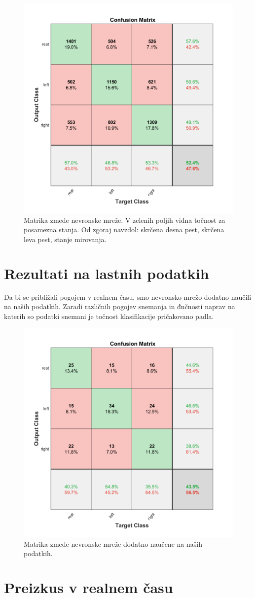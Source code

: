 \begin{figure}
\begin{center}
\includegraphics[width=0.8\linewidth]{slike/Confusion_13-20Hz_0s-4s.png}
\end{center}
\caption{Matrika zmede nevronske mreže. V zelenih poljih vidna točnost za posamezna stanja. Od zgoraj navzdol: skrčena desna pest, skrčena leva pest, stanje mirovanja.}
\label{slika:nevronska_mreza_matrika}
\end{figure}



\section{Rezultati na lastnih podatkih}
Da bi se približali pogojem v realnem času, smo nevronsko mrežo dodatno naučili na naših podatkih. Zaradi različnih pogojev snemanja in đnčnosti naprav na katerih so podatki snemani je točnost klasifikacije pričakovano padla.
\begin{figure}
\begin{center}
\includegraphics[width=0.5\linewidth]{slike/Confusion_13-20Hz_0s-4s_retrained.png}
\end{center}
\caption{Matrika zmede nevronske mreže dodatno naučene na naših podatkih.}
\end{figure}
\section{Preizkus v realnem času}




